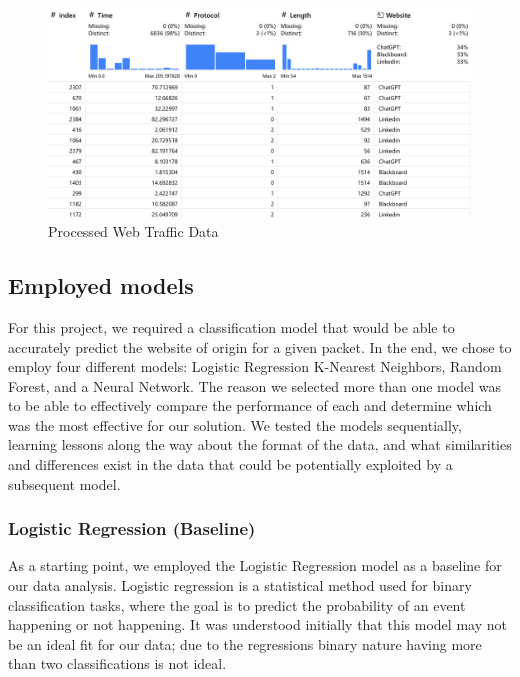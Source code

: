 \documentclass[10pt,sigconf,letterpaper,nonacm]{acmart}
\begin{document}
\begin{figure}[htp] 
  \centering
  \includegraphics[width=\textwidth]{Figures_and_Graphs/fullDataDiagram.png}
  \caption{Processed Web Traffic Data}
  \label{fig:webTraffic}
\end{figure}

\subsection{Employed models}
For this project, we required a classification model that would be able to accurately predict the website of origin for a given packet. In the end, we chose to employ four different models: Logistic Regression K-Nearest Neighbors, Random Forest, and a Neural Network.
The reason we selected more than one model was to be able to effectively compare the performance of each and determine which was the most effective for our solution.
We tested the models sequentially, learning lessons along the way about the format of the data, and what similarities and differences exist in the data that could be potentially exploited by a subsequent model.

\subsubsection{Logistic Regression (Baseline)}
As a starting point, we employed the Logistic Regression model as a baseline for our data analysis. Logistic regression is a statistical method used for binary classification tasks, where the goal is to predict the probability of an event happening or not happening.
It was understood initially that this model may not be an ideal fit for our data; due to the regressions binary nature having more than two classifications is not ideal.
\end{document}
